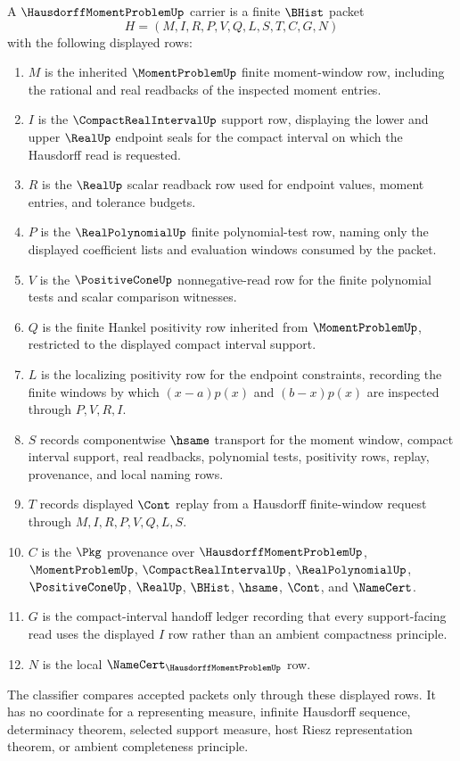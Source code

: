 \begin{definition}
\label{def:hausdorff-moment-problem-carrier}
A $\HausdorffMomentProblemUp$ carrier is a finite $\BHist$ packet
$$
H=(M,I,R,P,V,Q,L,S,T,C,G,N)
$$
with the following displayed rows:
\begin{enumerate}
\item $M$ is the inherited $\MomentProblemUp$ finite moment-window row, including the rational and real readbacks of the inspected moment entries.
\item $I$ is the $\CompactRealIntervalUp$ support row, displaying the lower and upper $\RealUp$ endpoint seals for the compact interval on which the Hausdorff read is requested.
\item $R$ is the $\RealUp$ scalar readback row used for endpoint values, moment entries, and tolerance budgets.
\item $P$ is the $\RealPolynomialUp$ finite polynomial-test row, naming only the displayed coefficient lists and evaluation windows consumed by the packet.
\item $V$ is the $\PositiveConeUp$ nonnegative-read row for the finite polynomial tests and scalar comparison witnesses.
\item $Q$ is the finite Hankel positivity row inherited from $\MomentProblemUp$, restricted to the displayed compact interval support.
\item $L$ is the localizing positivity row for the endpoint constraints, recording the finite windows by which $(x-a)p(x)$ and $(b-x)p(x)$ are inspected through $P,V,R,I$.
\item $S$ records componentwise $\hsame$ transport for the moment window, compact interval support, real readbacks, polynomial tests, positivity rows, replay, provenance, and local naming rows.
\item $T$ records displayed $\Cont$ replay from a Hausdorff finite-window request through $M,I,R,P,V,Q,L,S$.
\item $C$ is the $\Pkg$ provenance over $\HausdorffMomentProblemUp$, $\MomentProblemUp$, $\CompactRealIntervalUp$, $\RealPolynomialUp$, $\PositiveConeUp$, $\RealUp$, $\BHist$, $\hsame$, $\Cont$, and $\NameCert$.
\item $G$ is the compact-interval handoff ledger recording that every support-facing read uses the displayed $I$ row rather than an ambient compactness principle.
\item $N$ is the local $\NameCert_{\HausdorffMomentProblemUp}$ row.
\end{enumerate}
The classifier compares accepted packets only through these displayed rows. It has no coordinate for a representing measure, infinite Hausdorff sequence, determinacy theorem, selected support measure, host Riesz representation theorem, or ambient completeness principle.
\end{definition}

